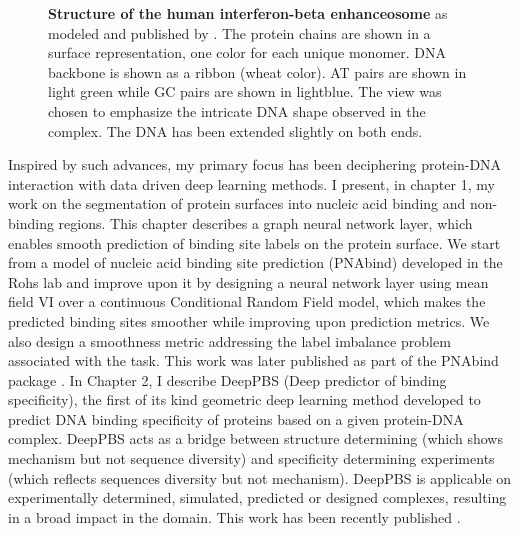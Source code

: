 \begin{center}
    \begin{figure}[H]
        \caption[Structure of the human interferon-beta enhanceosome]{\textbf{ Structure of the human interferon-beta enhanceosome} as modeled and published by \citet{panne2007atomic}. The protein chains are shown in a surface representation, one color for each unique monomer. DNA backbone is shown as a ribbon (wheat color). AT pairs are shown in light green while GC pairs are shown in lightblue. The view was chosen to emphasize the intricate DNA shape observed in the complex. The DNA has been extended slightly on both ends.}
  \label{fig:mmc2}
\end{figure}
\end{center}

Inspired by such advances, my primary focus has been deciphering protein-DNA interaction with data driven deep learning methods. I present, in chapter 1,
my work on the segmentation of protein surfaces into nucleic acid binding and non-binding regions. This chapter describes a graph neural network layer, which enables smooth prediction of binding site labels on the protein surface. We start from a model of nucleic acid binding site
prediction (PNAbind) developed in the Rohs lab and improve upon it by designing a neural network layer using mean field
VI over a continuous Conditional Random Field model, which makes the predicted binding sites smoother while improving upon prediction metrics. We also design a smoothness metric addressing the label imbalance problem associated with the task. This work was later published as part of the PNAbind package \citep{Sagendorf2024}.
In Chapter 2, I describe DeepPBS (Deep predictor of binding specificity), the first of its kind geometric deep learning method developed to predict DNA binding specificity of proteins based on a given protein-DNA complex. DeepPBS acts as a bridge between structure determining (which shows mechanism but not sequence diversity) and specificity determining experiments (which reflects sequences diversity but not mechanism). DeepPBS is applicable on experimentally determined, simulated, predicted or designed complexes, resulting in a broad impact in the domain. This work has been recently published \citep{Mitra2024}.

